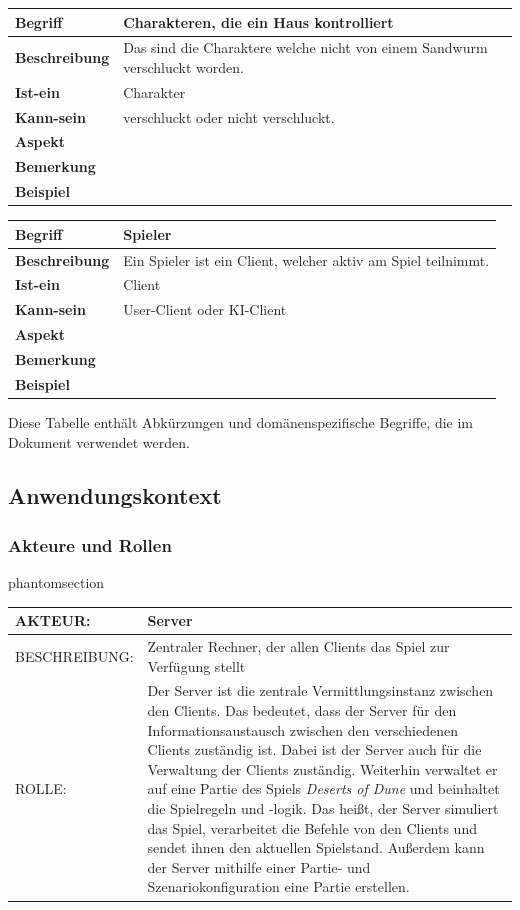 \documentclass[12pt]{article}
\makeatletter
\newcommand{\labeltext}[2]{%
  \@bsphack
  \csname phantomsection\endcsname %
  \def\@currentlabel{#1}{\label{#2}}%
  \@esphack
}
\newcommand{\akteur}[4]{
\labeltext{#2}{#1}
\begin{tabularx}{16cm}{|l|X|}
\hline 
AKTEUR: & #2 \\
\hline
BESCHREIBUNG: & #3 \\
\hline
ROLLE: & #4 \\ 
\hline
\end{tabularx}
}
\makeatother
\begin{document}
\begin{tabularx}{16cm}{|l|X|}
\hline
\textbf{Begriff} & \textbf{Charakteren, die ein Haus kontrolliert } \\
\hline
\textbf{Beschreibung} & Das sind die Charaktere welche nicht von einem Sandwurm verschluckt worden. \\
\hline
\textbf{Ist-ein} & Charakter\\
\hline
\textbf{Kann-sein} & verschluckt oder nicht verschluckt.\\
\hline
\textbf{Aspekt} &  \\
\hline
\textbf{Bemerkung} & \\
\hline
\textbf{Beispiel} & \\
\hline
\end{tabularx}

\begin{tabularx}{16cm}{|l|X|}
\hline
\textbf{Begriff} & \textbf{Spieler} \\
\hline
\textbf{Beschreibung} & Ein Spieler ist ein Client, welcher aktiv am Spiel teilnimmt.  \\
\hline
\textbf{Ist-ein} & Client\\
\hline
\textbf{Kann-sein} & User-Client oder KI-Client\\
\hline
\textbf{Aspekt} &  \\
\hline
\textbf{Bemerkung} & \\
\hline
\textbf{Beispiel} & \\
\hline
\end{tabularx}


Diese Tabelle enthält Abkürzungen und domänenspezifische Begriffe, die im Dokument verwendet
werden.

\subsection{Anwendungskontext}
\subsubsection{Akteure und Rollen}

\akteur{A-Server}{Server}{Zentraler Rechner, der allen Clients das Spiel zur Verfügung stellt}{Der Server ist die zentrale Vermittlungsinstanz zwischen den Clients. Das bedeutet, dass der Server für den Informationsaustausch zwischen den verschiedenen Clients zuständig ist. Dabei ist der Server auch für die Verwaltung der Clients zuständig. Weiterhin verwaltet er auf eine Partie des Spiels \textit{Deserts of Dune} und beinhaltet die Spielregeln und -logik. Das heißt, der Server simuliert das Spiel, verarbeitet die Befehle von den Clients und sendet ihnen den aktuellen Spielstand. Außerdem kann der Server mithilfe einer Partie- und Szenariokonfiguration eine Partie erstellen.}
\end{document}
